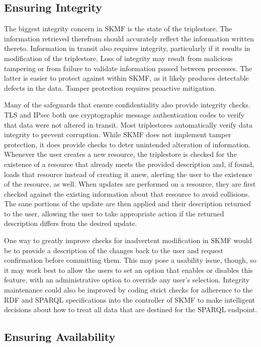 \subsection{Ensuring Integrity}
\label{result:integrity}

The biggest integrity concern in SKMF is the state of the triplestore. The information retrieved therefrom should accurately reflect the information written thereto. Information in transit also requires integrity, particularly if it results in modification of the triplestore. Loss of integrity may result from malicious tampering or from failure to validate information passed between processes. The latter is easier to protect against within SKMF, as it likely produces detectable defects in the data. Tamper protection requires proactive mitigation.

Many of the safeguards that ensure confidentiality also provide integrity checks. TLS and IPsec both use cryptographic message authentication codes to verify that data were not altered in transit. Most triplestores automatically verify data integrity to prevent corruption. While SKMF does not implement tamper protection, it does provide checks to deter unintended alteration of information. Whenever the user creates a new resource, the triplestore is checked for the existence of a resource that already meets the provided description and, if found, loads that resource instead of creating it anew, alerting the user to the existence of the resource, as well. When updates are performed on a resource, they are first checked against the existing information about that resource to avoid collisions. The sane portions of the update are then applied and their description returned to the user, allowing the user to take appropriate action if the returned description differs from the desired update.

One way to greatly improve checks for inadvertent modification in SKMF would be to provide a description of the changes back to the user and request confirmation before committing them. This may pose a usability issue, though, so it may work best to allow the users to set an option that enables or disables this feature, with an administrative option to override any user's selection. Integrity maintenance could also be improved by coding strict checks for adherence to the RDF and SPARQL specifications into the controller of SKMF to make intelligent decisions about how to treat all data that are destined for the SPARQL endpoint.


\subsection{Ensuring Availability}
\label{result:availability}

